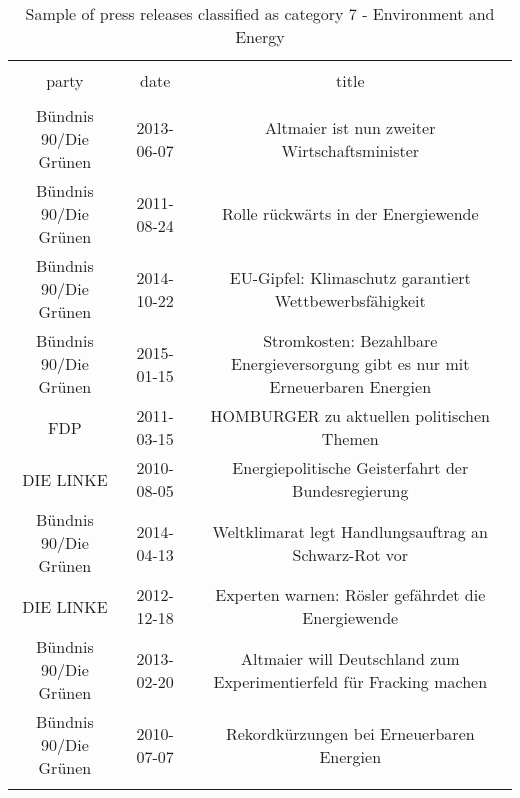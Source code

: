 
\begin{table}[!htbp] \centering 
  \caption{Sample of press releases classified as category 7 - Environment and Energy} 
  \label{tab:7-document-samples} 
\begin{tabular}{@{\extracolsep{5pt}} ccc} 
\\[-1.8ex]\hline 
\hline \\[-1.8ex] 
party & date & title \\ 
\hline \\[-1.8ex] 
Bündnis 90/Die Grünen & 2013-06-07 & Altmaier ist nun zweiter Wirtschaftsminister \\ 
Bündnis 90/Die Grünen & 2011-08-24 & Rolle rückwärts in der Energiewende \\ 
Bündnis 90/Die Grünen & 2014-10-22 & EU-Gipfel: Klimaschutz garantiert Wettbewerbsfähigkeit \\ 
Bündnis 90/Die Grünen & 2015-01-15 & Stromkosten: Bezahlbare Energieversorgung gibt es nur mit Erneuerbaren Energien \\ 
FDP & 2011-03-15 & HOMBURGER zu aktuellen politischen Themen \\ 
DIE LINKE & 2010-08-05 & Energiepolitische Geisterfahrt der Bundesregierung \\ 
Bündnis 90/Die Grünen & 2014-04-13 & Weltklimarat legt Handlungsauftrag an Schwarz-Rot vor \\ 
DIE LINKE & 2012-12-18 & Experten warnen: Rösler gefährdet die Energiewende \\ 
Bündnis 90/Die Grünen & 2013-02-20 & Altmaier will Deutschland zum Experimentierfeld für Fracking machen \\ 
Bündnis 90/Die Grünen & 2010-07-07 & Rekordkürzungen bei Erneuerbaren Energien \\ 
\hline \\[-1.8ex] 
\end{tabular} 
\end{table} 

